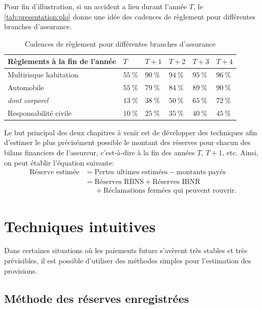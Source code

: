 Pour fin d'illustration, si un accident a lieu durant l'année $T$, le
\autoref{tab:presentation:plo} donne une idée des cadences de
règlement pour différentes branches d'assurance.

\begin{table}
  \centering
  \caption{Cadences de règlement pour différentes branches
    d'assurance}
  \label{tab:presentation:plo}
  \begin{tabular}{llllll}
    \toprule
    Règlements à la fin de l'année  & $T$ & $T+1$ & $T+2$ & $T+3$ & $T+4$\\
    \midrule
    Multirisque habitation & $55~\%$ & $90~\%$ & $94~\%$ & $95~\%$ & $96~\%$ \\
    Automobile & $55~\%$ & $79~\%$ & $84~\%$ & $89~\%$ & $90~\%$ \\
    \textit{dont corporel} & $13~\%$ & $38~\%$ & $50~\%$ & $65~\%$ & $72~\%$ \\
    Responsabilité civile & $10~\%$ & $25~\%$ & $35~\%$ & $40~\%$ & $45~\%$ \\
    \bottomrule
  \end{tabular}
\end{table}

Le but principal des deux chapitres à venir est de développer des
techniques afin d'estimer le plus précisément possible le montant des
réserves pour chacun des bilans financiers de l'assureur, c'est-à-dire
à la fin des années $T$, $T+1$, etc. Ainsi, on peut établir l'équation
suivante:
\begin{align*}
  \text{Réserve estimée}
  &= \text{Pertes ultimes estimées} - \text{montants payés}\\
  &= \text{Réserves RBNS} + \text{Réserves IBNR} \\
  &\phantom{=} + \text{Réclamations fermées qui peuvent rouvrir}.
\end{align*}


\section{Techniques intuitives}
\label{sec:presentation:techniques}

Dans certaines situations où les paiements futurs s'avèrent très
stables et très prévisibles, il est possible d'utiliser des méthodes
simples pour l'estimation des provisions.

\subsection{Méthode des réserves enregistrées}

